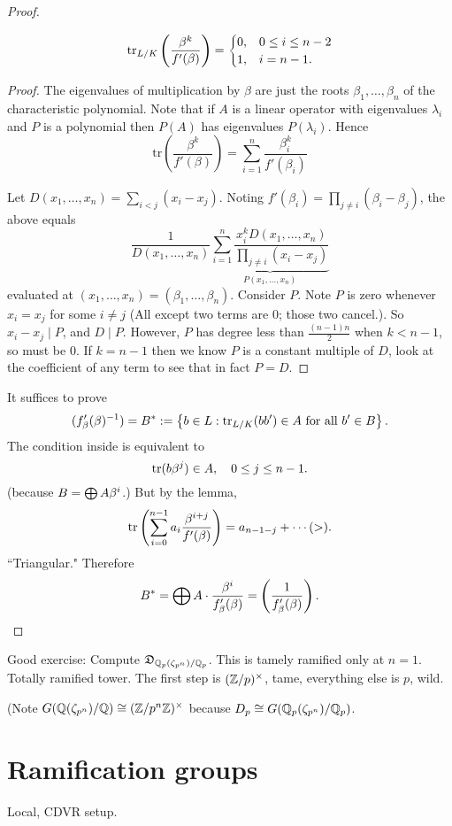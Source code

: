 \begin{proof}
\begin{lem}
\[
\operatorname{tr}_{L/K}\left( {\frac{\beta^k}{f'(\beta)}} \right) =\begin{cases}
0,& 0\le i\le n-2\\
1,& i=n-1.
\end{cases}
\]
\end{lem}
\begin{proof}The eigenvalues of multiplication by $\beta$ are just the roots $\beta_{1},\ldots,\beta_{n}$
of the characteristic polynomial. Note that if $A$ is a linear operator
with eigenvalues $\lambda_{i}$ and $P$ is a polynomial then $P(A)$
has eigenvalues $P(\lambda_{i})$. Hence
\[
\text{tr}\left(\frac{\beta^{k}}{f'(\beta)}\right)=\sum_{i=1}^{n}\frac{\beta_{i}^{k}}{f'(\beta_{i})}\]

Let $D(x_{1},\ldots,x_{n})=\sum_{i<j}(x_{i}-x_{j})$. Noting $f'(\beta_{i})=\prod_{j\neq i}(\beta_{i}-\beta_{j})$,
the above equals
\[
\frac{1}{D(x_{1},\ldots,x_{n})}\underbrace{\sum_{i=1}^{n}\frac{x_{i}^{k}D(x_{1},\ldots,x_{n})}{\prod_{j\neq i}(x_{i}-x_{j})}}_{P(x_{1},\ldots,x_{n})}\]
evaluated at $(x_{1},\ldots,x_{n})=(\beta_{1},\ldots,\beta_{n})$.
Consider $P$. Note $P$ is zero whenever $x_{i}=x_{j}$ for some
$i\ne j$ (All except two terms are 0; those two cancel.). So $x_{i}-x_{j}\mid P$,
and $D\mid P$. However, $P$ has degree less than $\frac{(n-1)n}{2}$
when $k<n-1$, so must be 0. If $k=n-1$ then we know $P$ is a constant
multiple of $D$, look at the coefficient of any term to see that
in fact $P=D$.
\end{proof}
It suffices to prove
\[
(f_{\beta}'(\beta)^{-1})=B^*:=\left\{{b\in L}:{\operatorname{tr}_{L/K}(bb')\in A\text{ for all }b'\in B}\right\}.
\]
The condition inside is equivalent to 
\[
\operatorname{tr}(b\beta^j)\in A,\quad 0\le j\le n-1.
\]
(because $B=\bigoplus A\beta^i$.)
But by the lemma,
\[
\operatorname{tr}\left( {
\sum_{i=0}^{n-1} a_i \frac{\beta^{i+j}}{f'(\beta)}} \right)
=a_{n-1-j}+\cdots(>).
\]
``Triangular."
Therefore
\[
B^*=\bigoplus A\cdot \frac{\beta^i}{f_{\beta}'(\beta)}=\left( {\frac{1}{f'_{\beta}(\beta)}} \right).
\]
\end{proof}
Good exercise: Compute $\mathfrak D_{\mathbb{Q}_p(\zeta_{p^n})/\mathbb{Q}_p}$. This is tamely ramified only at $n=1$. Totally ramified tower. The first step is $(\mathbb{Z}/p)^{\times}$, tame, everything else is $p$, wild.

(Note $G(\mathbb{Q}(\zeta_{p^n})/\mathbb{Q})\cong (\mathbb{Z}/p^n\mathbb{Z})^{\times}$ because $D_{p}\cong G(\mathbb{Q}_p(\zeta_{p^n})/\mathbb{Q}_p)$.
\section{Ramification groups}
Local, CDVR setup.

